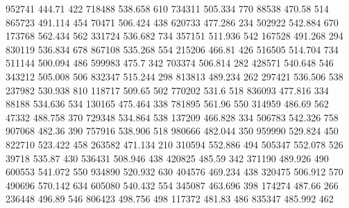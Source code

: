 952741 444.71 422
718488 538.658 610
734311 505.334 770
88538 470.58 514
865723 491.114 454
70471 506.424 438
620733 477.286 234
502922 542.884 670
173768 562.434 562
331724 536.682 734
357151 511.936 542
167528 491.268 294
830119 536.834 678
867108 535.268 554
215206 466.81 426
516505 514.704 734
511144 500.094 486
599983 475.7 342
703374 506.814 282
428571 540.648 546
343212 505.008 506
832347 515.244 298
813813 489.234 262
297421 536.506 538
237982 530.938 810
118717 509.65 502
770202 531.6 518
836093 477.816 334
88188 534.636 534
130165 475.464 338
781895 561.96 550
314959 486.69 562
47332 488.758 370
729348 534.864 538
137209 466.828 334
506783 542.326 758
907068 482.36 390
757916 538.906 518
980666 482.044 350
959990 529.824 450
822710 523.422 458
263582 471.134 210
310594 552.886 494
505347 552.078 526
39718 535.87 430
536431 508.946 438
420825 485.59 342
371190 489.926 490
600553 541.072 550
934890 520.932 630
404576 469.234 438
320475 506.912 570
490696 570.142 634
605080 540.432 554
345087 463.696 398
174274 487.66 266
236448 496.89 546
806423 498.756 498
117372 481.83 486
835347 485.992 462

